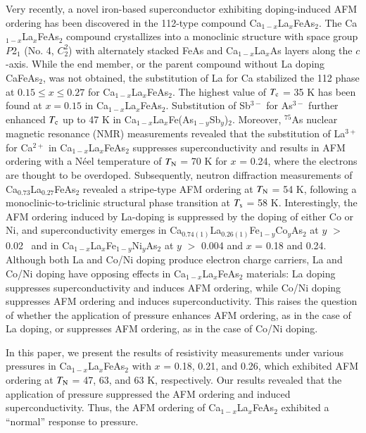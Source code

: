 \documentclass [letter,twocolumn]{jpsj3}
\begin{document}
Very recently, a novel iron-based superconductor exhibiting doping-induced AFM ordering has been discovered in the 112-type compound Ca$_{1-x}$La$_{x}$FeAs$_{2}$. \cite{N.Katayama_JPSJ_2013,K.Kudo_JPSJ_2014,K.Kudo_JPSJ_2014-2,H.Yakita_JACS_2014,M.Nohara_APX_2017}
The Ca$_{1-x}$La$_{x}$FeAs$_{2}$ compound crystallizes into a monoclinic structure with space group $P$2$_1$ (No. 4, $C_{2}^{2}$) 
with alternately stacked FeAs and Ca$_{1-x}$La$_{x}$As layers along the $c$-axis.
While the end member, or the parent compound without La doping CaFeAs$_{2}$, was not obtained, the substitution of La for Ca stabilized the 112 phase at $0.15 \leq x \leq 0.27$ for Ca$_{1-x}$La$_{x}$FeAs$_{2}$.
The highest value of $T_{\rm c}$ = 35 K has been found at $x = 0.15$ in Ca$_{1-x}$La$_{x}$FeAs$_{2}$.\cite{K.Kudo_JPSJ_2014}
Substitution of Sb$^{3-}$ for As$^{3-}$ further enhanced $T_{\rm c}$ up to 47 K in Ca$_{1-x}$La$_{x}$Fe(As$_{1-y}$Sb$_{y}$)$_{2}$. \cite{K.Kudo_JPSJ_2014-2,Ota_JPSJ_2017}
Moreover, $^{75}$As nuclear magnetic resonance (NMR) measurements revealed that the substitution of La$^{3+}$ for Ca$^{2+}$ in Ca$_{1-x}$La$_{x}$FeAs$_{2}$ suppresses superconductivity and results in AFM ordering with a N\'eel temperature of $T_{\rm N}$ = 70 K for $x$ = 0.24, where the electrons are thought to be overdoped. \cite{S.Kawasaki_PRB_2015} 
Subsequently, neutron diffraction measurements of Ca$_{0.73}$La$_{0.27}$FeAs$_{2}$ revealed a stripe-type AFM ordering at $T_{\rm N}$ = 54 K, following a monoclinic-to-triclinic structural phase transition at $T_{\rm s}$ = 58 K. \cite{S.Jiang_PRB_2016}
Interestingly, the AFM ordering induced by La-doping is suppressed by the doping of either Co or Ni, 
and superconductivity emerges in Ca$_{0.74(1)}$La$_{0.26(1)}$Fe$_{1-y}$Co$_{y}$As$_{2}$ at $y$ $>$ 0.02~\cite{S.Jiang_PRB_2016_2} and in Ca$_{1-x}$La$_{x}$Fe$_{1-y}$Ni$_{y}$As$_{2}$ at $y$ $>$ 0.004 and $x$ = 0.18 and 0.24. \cite{T.Xie_arXiv_2017}
%
Although both La and Co/Ni doping produce electron charge carriers, La and Co/Ni doping have opposing effects in Ca$_{1-x}$La$_{x}$FeAs$_{2}$ materials: La doping suppresses superconductivity and induces AFM ordering, while Co/Ni doping suppresses AFM ordering and induces superconductivity. 
This raises the question of whether the application of pressure enhances AFM ordering, as in the case of La doping, or suppresses AFM ordering, as in the case of Co/Ni doping.

In this paper, we present the results of resistivity measurements under various pressures in Ca$_{1-x}$La$_{x}$FeAs$_{2}$ with $x$ = 0.18, 0.21, and 0.26, which exhibited AFM ordering at $T_{\rm N}$ = 47, 63, and 63 K, respectively. 
Our results revealed that the application of pressure suppressed the AFM ordering and induced superconductivity. 
Thus, the AFM ordering of Ca$_{1-x}$La$_{x}$FeAs$_{2}$ exhibited a ``normal'' response to pressure.
\end{document}
